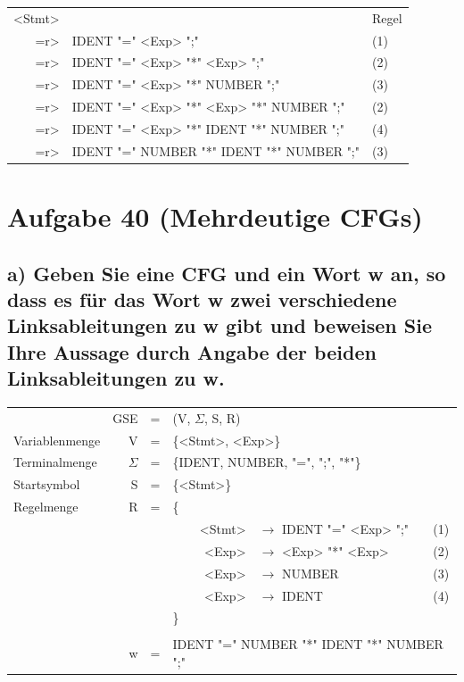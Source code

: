 \documentclass{article}
\begin{document}
\begin{center}
	\begin{tabular}{rll}
		<Stmt> & & Regel \\
		=r> & IDENT "=" <Exp> ";" & (1) \\
		=r> & IDENT "=" <Exp> "*" <Exp> ";" & (2)\\
		=r> & IDENT "=" <Exp> "*" NUMBER ";" & (3)\\
		=r> & IDENT "=" <Exp> "*" <Exp> "*" NUMBER ";" & (2)\\
		=r> & IDENT "=" <Exp> "*" IDENT "*" NUMBER ";" & (4)\\
		=r> & IDENT "=" NUMBER "*" IDENT "*" NUMBER ";" & (3)\\
	\end{tabular}
\end{center}


\section*{Aufgabe 40 (Mehrdeutige CFGs)}

\subsection*{a) Geben Sie eine CFG und ein Wort w an, so dass es für das Wort w zwei verschiedene Linksableitungen zu w gibt und beweisen Sie Ihre Aussage durch Angabe der beiden Linksableitungen zu w.}

\begin{center}
	\begin{tabular}{lrclrlc}
		& GSE & = & \multicolumn{4}{l}{(V, $\Sigma$, S, R)} \\
		Variablenmenge & V & = & \multicolumn{4}{l}{\{<Stmt>, <Exp>\}} \\
		Terminalmenge & $\Sigma$ & = & \multicolumn{4}{l}{\{IDENT, NUMBER, "=", ";", "*"\}} \\
		Startsymbol & S & = & \multicolumn{4}{l}{\{<Stmt>\}} \\
		Regelmenge & R & = & \{ \\
		& & & & <Stmt> & $\rightarrow$ IDENT "=" <Exp> ";" & (1) \\
		& & & & <Exp> & $\rightarrow$ <Exp> "*" <Exp> & (2) \\
		& & & & <Exp> & $\rightarrow$ NUMBER & (3) \\
		& & & & <Exp> & $\rightarrow$ IDENT & (4) \\
		& & & \} \\
		\\
		& w & = & \multicolumn{4}{l}{IDENT "=" NUMBER "*" IDENT "*" NUMBER ";"}
	\end{tabular}
\end{center}
\end{document}
